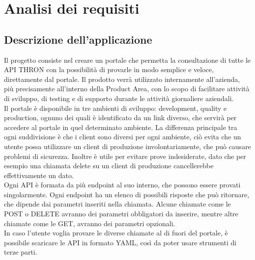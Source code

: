 \chapter{Analisi dei requisiti}
\label{cap:analisi-requisiti}

 
\section{Descrizione dell'applicazione}

Il progetto consiste nel creare un portale che permetta la consultazione di tutte le API THRON con la possibilità di provarle in modo semplice e veloce, direttamente dal portale.
Il prodotto verrà utilizzato internamente all'azienda, più precisamente all'interno della Product Area, con lo scopo di facilitare attività di sviluppo, di testing e di supporto durante le attività giornaliere aziendali.\\
Il portale è disponibile in tre ambienti di sviluppo: development, quality e production, ognuno dei quali è identificato da un link diverso, che servirà per accedere al portale in quel determinato ambiente.
La differenza principale tra ogni suddivisione è che i client sono diversi per ogni ambiente, ciò evita che un utente possa utilizzare un client di produzione involontariamente, che può causare problemi di sicurezza. Inoltre è utile per evitare prove indesiderate, dato che per esempio una chiamata delete su un client di produzione cancellerebbe effettivamente un dato.\\
Ogni API è formata da più endpoint al suo interno, che possono essere provati singolarmente. Ogni endpoint ha un elenco di possibili risposte che può ritornare, che dipende dai parametri inseriti nella chiamata.
Alcune chiamate come le POST o DELETE avranno dei parametri obbligatori da inserire, mentre altre chiamate come le GET, avranno dei parametri opzionali.\\
In caso l'utente voglia provare le diverse chiamate al di fuori del portale, è possibile scaricare le API in formato YAML, così da poter usare strumenti di terze parti.


